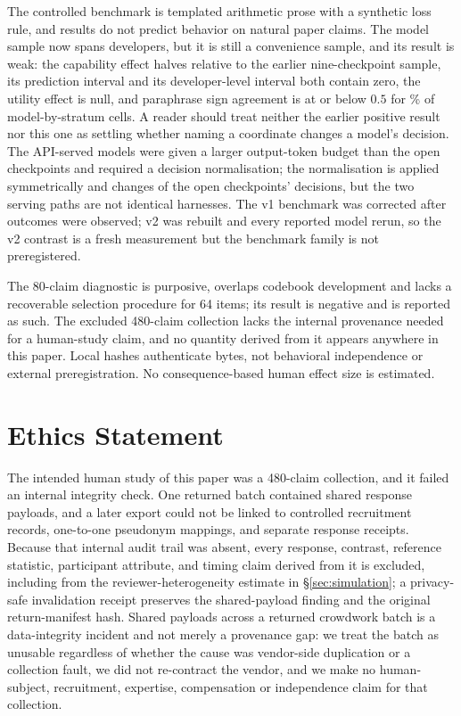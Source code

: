 \documentclass[11pt]{article}
\begin{document}
The controlled benchmark is templated arithmetic prose with a synthetic loss
rule, and results do not predict behavior on natural paper claims. The model
sample now spans \CMJdevelopers{} developers, but it is still a convenience
sample, and its result is weak: the capability effect halves relative to the earlier
nine-checkpoint sample, its prediction interval and its developer-level
interval both contain zero, the utility effect is null, and paraphrase sign
agreement is at or below $0.5$ for \CMJSignBelowHalf\% of model-by-stratum
cells. A reader should treat neither the earlier positive result nor this one
as settling whether naming a coordinate changes a model's decision. The
API-served models were given a larger output-token budget than the open
checkpoints and required a decision normalisation; the normalisation is applied
symmetrically and changes \CMJnormOpenChanged{} of the open checkpoints'
decisions, but the two serving paths are not identical harnesses. The v1
benchmark was corrected after outcomes were observed; v2 was rebuilt and every
reported model rerun, so the v2 contrast is a fresh measurement but the
benchmark family is not preregistered.

The 80-claim diagnostic is purposive, overlaps codebook development and lacks a
recoverable selection procedure for 64 items; its result is negative and is
reported as such. The excluded 480-claim collection lacks the internal
provenance needed for a human-study claim, and no quantity derived from it
appears anywhere in this paper. Local hashes authenticate bytes, not behavioral
independence or external preregistration. No consequence-based human effect
size is estimated.

\section*{Ethics Statement}

The intended human study of this paper was a 480-claim collection, and it
failed an internal integrity check. One returned batch contained shared
response payloads, and a later export could not be linked to controlled
recruitment records, one-to-one pseudonym mappings, and separate response
receipts. Because that internal audit trail was absent, every response,
contrast, reference statistic, participant attribute, and timing claim derived
from it is excluded, including from the reviewer-heterogeneity estimate in
\S\ref{sec:simulation}; a privacy-safe invalidation receipt preserves the
shared-payload finding and the original return-manifest hash. Shared payloads
across a returned crowdwork batch is a data-integrity incident and not merely a
provenance gap: we treat the batch as unusable regardless of whether the cause
was vendor-side duplication or a collection fault, we did not re-contract the
vendor, and we make no human-subject, recruitment, expertise, compensation or
independence claim for that collection.
\end{document}
